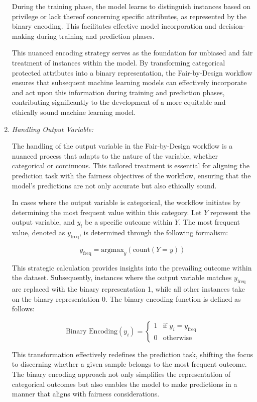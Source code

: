 \begin{enumerate}
    During the training phase, the model learns to distinguish instances based on privilege or lack thereof concerning specific attributes, as represented by the binary encoding. This facilitates effective model incorporation and decision-making during training and prediction phases.

    This nuanced encoding strategy serves as the foundation for unbiased and fair treatment of instances within the model. By transforming categorical protected attributes into a binary representation, the Fair-by-Design workflow ensures that subsequent machine learning models can effectively incorporate and act upon this information during training and prediction phases, contributing significantly to the development of a more equitable and ethically sound machine learning model.

    \item \emph{Handling Output Variable:} 
    
    The handling of the output variable in the Fair-by-Design workflow is a nuanced process that adapts to the nature of the variable, whether categorical or continuous. This tailored treatment is essential for aligning the prediction task with the fairness objectives of the workflow, ensuring that the model's predictions are not only accurate but also ethically sound.


    In cases where the output variable is categorical, the workflow initiates by determining the most frequent value within this category. Let $Y$ represent the output variable, and $y_i$ be a specific outcome within $Y$. The most frequent value, denoted as $y_{\text{freq}}$, is determined through the following formalism:

    \[
    y_{\text{freq}} = \text{argmax}_y \left( \text{count}(Y = y) \right)
    \]

    This strategic calculation provides insights into the prevailing outcome within the dataset. Subsequently, instances where the output variable matches $y_{\text{freq}}$ are replaced with the binary representation 1, while all other instances take on the binary representation 0. The binary encoding function is defined as follows:

    \[
    \text{Binary Encoding}(y_i) = \begin{cases} 
    1 & \text{if } y_i = y_{\text{freq}} \\ 
    0 & \text{otherwise}
    \end{cases}
    \]

    This transformation effectively redefines the prediction task, shifting the focus to discerning whether a given sample belongs to the most frequent outcome. The binary encoding approach not only simplifies the representation of categorical outcomes but also enables the model to make predictions in a manner that aligns with fairness considerations.



\end{enumerate}
